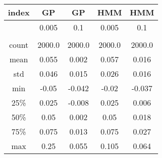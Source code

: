 \centering \begin{tabular}{c|c|c|c|c}
index	&GP	&GP	&HMM	&HMM\\\hline
	&0.005	&0.1	&0.005	&0.1\\
	&	&	&	&\\
count	&2000.0	&2000.0	&2000.0	&2000.0\\
mean	&0.055	&0.002	&0.057	&0.016\\
std	&0.046	&0.015	&0.026	&0.016\\
min	&-0.05	&-0.042	&-0.02	&-0.037\\
25\%	&0.025	&-0.008	&0.025	&0.006\\
50\%	&0.05	&0.002	&0.05	&0.018\\
75\%	&0.075	&0.013	&0.075	&0.027\\
max	&0.25	&0.055	&0.105	&0.064\\
\end{tabular}

